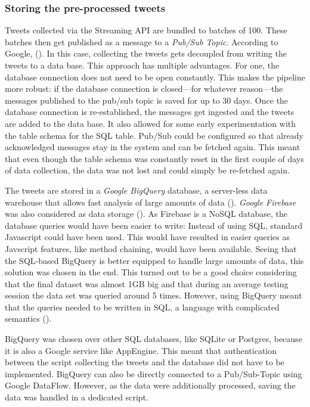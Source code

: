 \subsubsection{Storing the pre-processed tweets}
Tweets collected via the Streaming API are bundled to batches of 100. These batches then get published as a message to a \emph{Pub/Sub Topic}. According to Google,  (\cite{google2020a}). In this case, collecting the tweets gets decoupled from writing the tweets to a data base. This approach has multiple advantages. For one, the database connection does not need to be open constantly. This makes the pipeline more robust: if the database connection is closed---for whatever reason---the messages published to the pub/sub topic is saved for up to 30 days. Once the database connection is re-established, the messages get ingested and the tweets are added to the data base. It also allowed for some early experimentation with the table schema for the SQL table. Pub/Sub could be configured so that already acknowledged messages stay in the system and can be fetched again. This meant that even though the table schema was constantly reset in the first couple of days of data collection, the data was not lost and could simply be re-fetched again.

The tweets are stored in a \emph{Google BigQuery} database, a server-less data warehouse that allows fast analysis of large amounts of data (\cite{google2020b}). \emph{Google Firebase} was also considered as data storage (\cite{google2020c}). As Firebase is a NoSQL database, the database queries would have been easier to write: Instead of using SQL, standard Javascript could have been used. This would have resulted in easier queries as Javscript features, like method chaining, would have been available. Seeing that the SQL-based BigQuery is better equipped to handle large amounts of data, this solution was chosen in the end. This turned out to be a good choice considering that the final dataset was almost 1GB big and that during an average testing session the data set was queried around 5 times. However, using BigQuery meant that the queries needed to be written in SQL, a language with complicated semantics (\cite{slutz1998massive}).

BigQuery was chosen over other SQL databases, like SQLite or Postgres, because it is also a Google service like AppEngine. This meant that authentication between the script collecting the tweets and the database did not have to be implemented. BigQuery can also be directly connected to a Pub/Sub-Topic using Google DataFlow. However, as the data were additionally processed, saving the data was handled in a dedicated script. 

